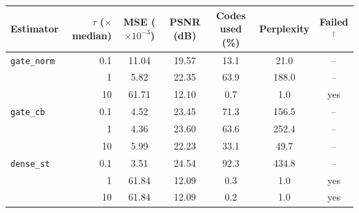 \begin{tabular}{lrccccc}
\toprule
Estimator & $\tau$ ($\times$ median) & MSE ($\times 10^{-3}$) & PSNR (dB) & Codes used (\%) & Perplexity & Failed$^\dagger$ \\
\midrule
\texttt{gate\_norm} & 0.1 & 11.04 & 19.57 & 13.1 & 21.0 & -- \\
 & 1 & 5.82 & 22.35 & 63.9 & 188.0 & -- \\
 & 10 & 61.71 & 12.10 & 0.7 & 1.0 & yes \\
\midrule
\texttt{gate\_cb} & 0.1 & 4.52 & 23.45 & 71.3 & 156.5 & -- \\
 & 1 & 4.36 & 23.60 & 63.6 & 252.4 & -- \\
 & 10 & 5.99 & 22.23 & 33.1 & 49.7 & -- \\
\midrule
\texttt{dense\_st} & 0.1 & 3.51 & 24.54 & 92.3 & 434.8 & -- \\
 & 1 & 61.84 & 12.09 & 0.3 & 1.0 & yes \\
 & 10 & 61.84 & 12.09 & 0.2 & 1.0 & yes \\
\bottomrule
\end{tabular}
